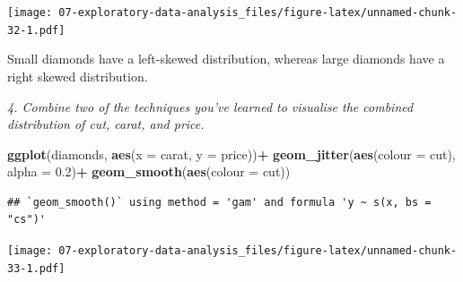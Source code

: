 \documentclass[]{book}
\newenvironment{Shaded}{\begin{snugshade}}{\end{snugshade}}
\newcommand{\DataTypeTok}[1]{\textcolor[rgb]{0.13,0.29,0.53}{#1}}
\newcommand{\FloatTok}[1]{\textcolor[rgb]{0.00,0.00,0.81}{#1}}
\newcommand{\KeywordTok}[1]{\textcolor[rgb]{0.13,0.29,0.53}{\textbf{#1}}}
\newcommand{\NormalTok}[1]{#1}
\newcommand{\OperatorTok}[1]{\textcolor[rgb]{0.81,0.36,0.00}{\textbf{#1}}}
\newcommand{\StringTok}[1]{\textcolor[rgb]{0.31,0.60,0.02}{#1}}
\theoremstyle{definition}
\theoremstyle{definition}
\theoremstyle{definition}
\theoremstyle{remark}
\begin{document}
\begin{Shaded}
\end{Shaded}

\texttt{[image: 07-exploratory-data-analysis\_files/figure-latex/unnamed-chunk-32-1.pdf]}

Small diamonds have a left-skewed distribution, whereas large diamonds
have a right skewed distribution.

\emph{4. Combine two of the techniques you've learned to visualise the
combined distribution of cut, carat, and price.}

\begin{Shaded}
\begin{Highlighting}[]
\KeywordTok{ggplot}\NormalTok{(diamonds, }\KeywordTok{aes}\NormalTok{(}\DataTypeTok{x =}\NormalTok{ carat, }\DataTypeTok{y =}\NormalTok{ price))}\OperatorTok{+}
\StringTok{  }\KeywordTok{geom_jitter}\NormalTok{(}\KeywordTok{aes}\NormalTok{(}\DataTypeTok{colour =}\NormalTok{ cut), }\DataTypeTok{alpha =} \FloatTok{0.2}\NormalTok{)}\OperatorTok{+}
\StringTok{  }\KeywordTok{geom_smooth}\NormalTok{(}\KeywordTok{aes}\NormalTok{(}\DataTypeTok{colour =}\NormalTok{ cut))}
\end{Highlighting}
\end{Shaded}

\begin{verbatim}
## `geom_smooth()` using method = 'gam' and formula 'y ~ s(x, bs = "cs")'
\end{verbatim}

\texttt{[image: 07-exploratory-data-analysis\_files/figure-latex/unnamed-chunk-33-1.pdf]}
\end{document}
